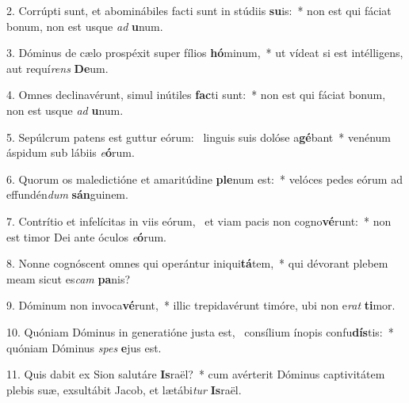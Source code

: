 2. Corrúpti sunt, et abominábiles facti sunt in stúdiis \textbf{su}is:~*  non est qui fáciat bonum, non est usque \textit{ad} \textbf{u}num.\

3. Dóminus de cælo prospéxit super fílios \textbf{hó}minum,~*  ut vídeat si est intélligens, aut requí\textit{rens} \textbf{De}um.\

4. Omnes declinavérunt, simul inútiles \textbf{fac}ti sunt:~*  non est qui fáciat bonum, non est usque \textit{ad} \textbf{u}num.\

5. Sepúlcrum patens est guttur eórum: \dag\  linguis suis dolóse a\textbf{gé}bant~*  venénum áspidum sub lábiis \textit{e}\textbf{ó}rum.\

6. Quorum os maledictióne et amaritúdine \textbf{ple}num est:~*  velóces pedes eórum ad effundén\textit{dum} \textbf{sán}guinem.\

7. Contrítio et infelícitas in viis eórum, \dag\  et viam pacis non cogno\textbf{vé}runt:~*  non est timor Dei ante óculos \textit{e}\textbf{ó}rum.\

8. Nonne cognóscent omnes qui operántur iniqui\textbf{tá}tem,~*  qui dévorant plebem meam sicut es\textit{cam} \textbf{pa}nis?\

9. Dóminum non invoca\textbf{vé}runt,~*  illic trepidavérunt timóre, ubi non e\textit{rat} \textbf{ti}mor.\

10. Quóniam Dóminus in generatióne justa est, \dag\  consílium ínopis confu\textbf{dís}tis:~*  quóniam Dóminus \textit{spes} \textbf{e}jus est.\

11. Quis dabit ex Sion salutáre \textbf{Is}raël?~*  cum avérterit Dóminus captivitátem plebis suæ, exsultábit Jacob, et lætábi\textit{tur} \textbf{Is}raël.\

